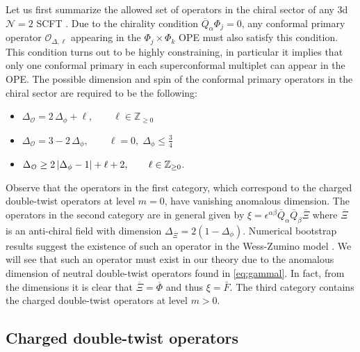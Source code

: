 \documentclass[11pt]{article}
\newcommand{\Phib}{\overline{\Phi}}
\newcommand{\Fb}{\bar{F}}
\begin{document}
Let us first summarize the allowed set of operators in the chiral sector of any 3d $\mathcal{N}=2$ SCFT \cite{Bobev:2015jxa}. Due to the chirality condition $\overline{Q}_{\alpha}\Phi_j = 0$, any conformal primary operator $\mathcal{O}_{\Delta,\ell}$ appearing in the $\Phi_j \times \Phi_k$ OPE must also satisfy this condition. This condition turns out to be highly constraining, in particular it implies that only one conformal primary in each superconformal multiplet can appear in the OPE. The possible dimension and spin of the conformal primary operators in the chiral sector are required to be the following:
%
\begin{itemize}
\item
$\Delta_{\mathcal{O}} = 2\, \Delta_\phi+\ell, \qquad  \ell \in \mathbb{Z}_{\geq 0}$
\item
$\Delta_{\mathcal{O}} = 3-2\, \Delta_\phi, \qquad  \ell = 0,\;\Delta_\phi \leq \frac{3}{4}$
\item
$\Delta_{\mathcal{O}} \geq 2\, \abs{\Delta_\phi-1} + \ell + 2, \qquad  \ell \in \mathbb{Z}_{\geq 0}$.
\end{itemize}
%
Observe that the operators in the first category, which correspond to the charged double-twist operators at level $m=0$, have vanishing anomalous dimension. The operators in the second category are in general given by  $\xi = \epsilon^{\alpha\beta}\bar{Q}_{\alpha}\bar{Q}_{\beta}\overline{\Xi}$ where $\overline{\Xi}$ is an anti-chiral field with dimension $\Delta_{\overline{\Xi}} = 2(1-\Delta_{\phi})$. Numerical bootstrap results suggest the existence of such an operator in the Wess-Zumino model \cite{Bobev:2015vsa}. We will see that such an operator must exist in our theory due to the anomalous dimension of neutral double-twist operators found in \eqref{eq:gammal}.  In fact, from the dimensions it is clear that  $\overline{\Xi} = \Phib$ and thus $\xi = \Fb$.  The third category contains the charged double-twist operators at level $m>0$.



\subsection{Charged double-twist operators}
\label{sec:chargeddtwist}
\end{document}
